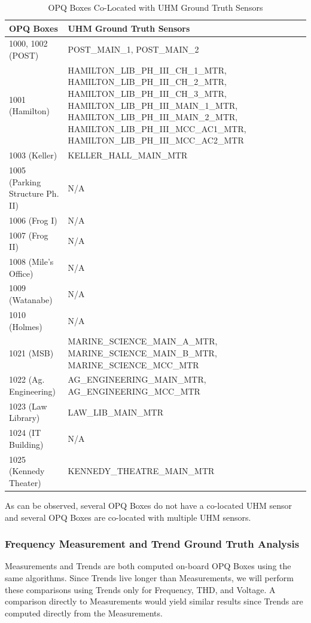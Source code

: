 \begin{table}[H]
    \centering
    \caption{OPQ Boxes Co-Located with UHM Ground Truth Sensors}
    \begin{tabularx}{\textwidth}{lX}
        \toprule
        \textbf{OPQ Boxes} & \textbf{UHM Ground Truth Sensors} \\
        \midrule
        1000, 1002 (POST) & POST\_MAIN\_1, POST\_MAIN\_2 \\
        1001 (Hamilton) & HAMILTON\_LIB\_PH\_III\_CH\_1\_MTR, HAMILTON\_LIB\_PH\_III\_CH\_2\_MTR, HAMILTON\_LIB\_PH\_III\_CH\_3\_MTR, HAMILTON\_LIB\_PH\_III\_MAIN\_1\_MTR, HAMILTON\_LIB\_PH\_III\_MAIN\_2\_MTR, HAMILTON\_LIB\_PH\_III\_MCC\_AC1\_MTR, HAMILTON\_LIB\_PH\_III\_MCC\_AC2\_MTR \\
        1003 (Keller) & KELLER\_HALL\_MAIN\_MTR \\
        1005 (Parking Structure Ph. II) & N/A \\
        1006 (Frog I) & N/A \\
        1007 (Frog II) & N/A \\
        1008 (Mile's Office) & N/A \\
        1009 (Watanabe) & N/A \\
        1010 (Holmes) & N/A \\
        1021 (MSB) & MARINE\_SCIENCE\_MAIN\_A\_MTR, MARINE\_SCIENCE\_MAIN\_B\_MTR, MARINE\_SCIENCE\_MCC\_MTR \\
        1022 (Ag. Engineering) & AG\_ENGINEERING\_MAIN\_MTR, AG\_ENGINEERING\_MCC\_MTR \\
        1023 (Law Library) & LAW\_LIB\_MAIN\_MTR \\
        1024 (IT Building) & N/A \\
        1025 (Kennedy Theater) & KENNEDY\_THEATRE\_MAIN\_MTR \\
        \bottomrule
    \end{tabularx}
    \label{table:gt}
\end{table}

As can be observed, several OPQ Boxes do not have a co-located UHM sensor and several OPQ Boxes are co-located with multiple UHM sensors.

\subsubsection{Frequency Measurement and Trend Ground Truth Analysis}

Measurements and Trends are both computed on-board OPQ Boxes using the same algorithms. Since Trends live longer than Measurements, we will perform these comparisons using Trends only for Frequency, THD, and Voltage. A comparison directly to Measurements would yield similar results since Trends are computed directly from the Measurements.

